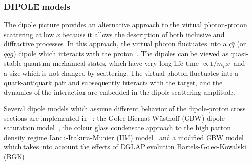 \subsubsection{DIPOLE models}

The dipole picture provides an alternative approach to the virtual photon-proton
 scattering at low $x$  because it allows the description of both inclusive and 
diffractive processes.
 In this approach, the virtual photon fluctuates into a $q\bar q$ (or $q\bar q g$) 
 dipole which interacts with the proton~\cite{NNZ:91}.  
The dipoles can be viewed as quasi-stable quantum mechanical states, which have very long 
life time $\propto 1/m_p x\;$ and a size which is not changed by scattering.
The virtual photon fluctuates into a quark-antiquark pair and subsequently interacts with the target, 
and the dynamics of the interaction are embedded in the dipole scattering amplitude.


Several dipole models which assume different behavior of the dipole-proton 
cross sections are implemented in \fitter\ :
the Golec-Biernat-W\"usthoff (GBW)
dipole saturation model~\cite{Golec-Biernat:1998js},
the colour glass condensate approach to the high parton density 
regime Iancu-Itakura-Munier (IIM) model~\cite{Iancu:2003ge} and 
a modified GBW model which takes into account the effects of  
DGLAP evolution Bartels-Golec-Kowalski (BGK)~\cite{Bartels:2002cj}.

